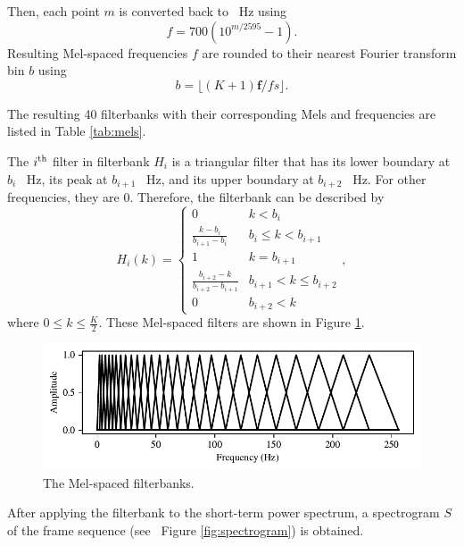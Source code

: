 			Then, each point $m$ is converted back to \SI{}{\Hz} using
			\begin{equation}
				f = 700\left(10^{m/2595}-1\right).
			\end{equation}
			Resulting Mel-spaced frequencies $f$ are rounded to their nearest Fourier transform bin $b$ using
			\begin{equation}
				b = \lfloor(K+1)\mathbf{f}/fs\rfloor.
			\end{equation}

			The resulting 40 filterbanks with their corresponding Mels and frequencies are listed in Table \ref{tab:mels}.

			The $i\textsuperscript{th}$ filter in filterbank $H_i$ is a triangular filter that has its lower boundary at $b_{i}$ \SI{}{\Hz}, its peak at $b_{i+1}$ \SI{}{\Hz}, and its upper boundary at $b_{i+2}$ \SI{}{\Hz}.
			For other frequencies, they are 0.
			Therefore, the filterbank can be described by
			\begin{equation}
				H_i(k) = \begin{cases}
					0 & k<b_i\\
					\frac{k-b_i}{b_{i+1}-b_i} & b_i\leq k < b_{i+1} \\
					1 & k = b_{i+1} \\
					\frac{b_{i+2} - k}{b_{i+2}-b_{i+1}} & b_{i+1} < k \leq b_{i+2}\\
					0 & b_{i+2} < k
				\end{cases},
			\end{equation}
			where $0 \leq k \leq \frac{K}{2}$.
			These Mel-spaced filters are shown in Figure \ref{fig:filterbank}.
			\begin{figure}[ht]
				\centering
			    \includegraphics[width=\linewidth]{gfx/fbanks}
			    \caption[Mel-spaced filterbanks]{The Mel-spaced filterbanks.}
			    \label{fig:filterbank}
			\end{figure}

			After applying the filterbank to the short-term power spectrum, a spectrogram $S$ of the frame sequence (see \eg~Figure \ref{fig:spectrogram}) is obtained.

